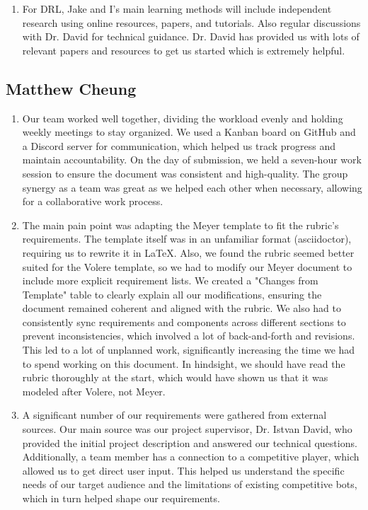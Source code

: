\documentclass{article}
\begin{document}
\begin{enumerate}
    \item For DRL, Jake and I's main learning methods will include independent
     research using online resources, papers, and tutorials. Also regular discussions
      with Dr. David for technical guidance. Dr. David has provided us with lots of relevant papers
      and resources to get us started which is extremely helpful. 
\end{enumerate}

\subsection*{Matthew Cheung}\label{subsec:matthew-cheung}
\begin{enumerate}
    \item
    Our team worked well together, dividing the workload evenly and holding weekly meetings to stay organized.
    We used a Kanban board on GitHub and a Discord server for communication, which helped us track progress and maintain accountability.
    On the day of submission, we held a seven-hour work session to ensure the document was consistent and high-quality.
    The group synergy as a team was great as we helped each other when necessary, allowing for a collaborative work process.

    \item The main pain point was adapting the Meyer template to fit the rubric's requirements.
    The template itself was in an unfamiliar format (asciidoctor), requiring us to rewrite it in LaTeX.
    Also, we found the rubric seemed better suited for the Volere template, so we had to modify our Meyer document to include more explicit requirement lists.
    We created a "Changes from Template" table to clearly explain all our modifications, ensuring the document remained coherent and aligned with the rubric.
    We also had to consistently sync requirements and components across different sections to prevent inconsistencies, which involved a lot of back-and-forth and revisions.
    This led to a lot of unplanned work, significantly increasing the time we had to spend working on this document.
    In hindsight, we should have read the rubric thoroughly at the start, which would have shown us that it was modeled after Volere, not Meyer.

    \item A significant number of our requirements were gathered from external sources.
    Our main source was our project supervisor, Dr. Istvan David, who provided the initial project description and answered our technical questions.
    Additionally, a team member has a connection to a competitive \emph{\Catan{}} player, which allowed us to get direct user input.
    This helped us understand the specific needs of our target audience and the limitations of existing competitive \AI{} bots, which in turn helped shape our requirements.


\end{enumerate}
\end{document}
